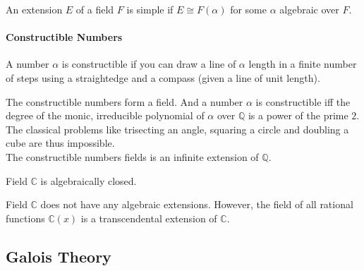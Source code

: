 \begin{definition}
	An extension $E$ of a field $F$ is simple if $E \cong F(\alpha)$ for some $\alpha$ algebraic over $F$.
\end{definition}


\paragraph{Constructible Numbers}
\begin{definition}
	A number $\alpha$ is constructible if you can draw a line of $\alpha$ length in a finite number of steps using a straightedge and a compass (given a line of unit length).
\end{definition}
	The constructible numbers form a field. And a number $\alpha$ is constructible iff the degree of the monic, irreducible polynomial of $\alpha$ over $\mathbb{Q}$ is a power of the prime $2$. The classical problems like trisecting an angle, squaring a circle and doubling a cube are thus impossible.\\

	The constructible numbers fields is an infinite extension of $\mathbb{Q}$.

\begin{definition}
	Field $\mathbb{C}$ is algebraically closed.
\end{definition}

	Field $\mathbb{C}$ does not have any algebraic extensions. However, the field of all rational functions $\mathbb{C}(x)$ is a transcendental extension of $\mathbb{C}$.
\subsection{Galois Theory}
